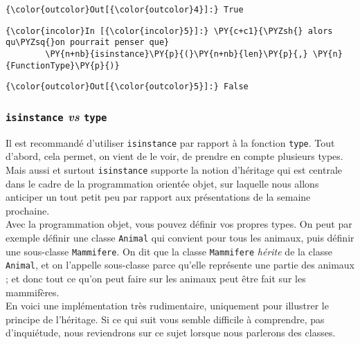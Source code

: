 \begin{Verbatim}[commandchars=\\\{\}]
{\color{outcolor}Out[{\color{outcolor}4}]:} True
\end{Verbatim}
            
    \begin{Verbatim}[commandchars=\\\{\}]
{\color{incolor}In [{\color{incolor}5}]:} \PY{c+c1}{\PYZsh{} alors qu\PYZsq{}on pourrait penser que}
        \PY{n+nb}{isinstance}\PY{p}{(}\PY{n+nb}{len}\PY{p}{,} \PY{n}{FunctionType}\PY{p}{)}
\end{Verbatim}


\begin{Verbatim}[commandchars=\\\{\}]
{\color{outcolor}Out[{\color{outcolor}5}]:} False
\end{Verbatim}
            
    \hypertarget{isinstance-vs-type}{%
\subsubsection{\texorpdfstring{\texttt{isinstance} \emph{vs}
\texttt{type}}{isinstance vs type}}\label{isinstance-vs-type}}

    Il est recommandé d'utiliser \texttt{isinstance} par rapport à la
fonction \texttt{type}. Tout d'abord, cela permet, on vient de le voir,
de prendre en compte plusieurs types.\\

Mais aussi et surtout \texttt{isinstance} supporte la notion d'héritage
qui est centrale dans le cadre de la programmation orientée objet, sur
laquelle nous allons anticiper un tout petit peu par rapport aux
présentations de la semaine prochaine.\\

Avec la programmation objet, vous pouvez définir vos propres types. On
peut par exemple définir une classe \texttt{Animal} qui convient pour
tous les animaux, puis définir une sous-classe \texttt{Mammifere}. On
dit que la classe \texttt{Mammifere} \emph{hérite} de la classe
\texttt{Animal}, et on l'appelle sous-classe parce qu'elle représente
une partie des animaux ; et donc tout ce qu'on peut faire sur les
animaux peut être fait sur les mammifères.\\

En voici une implémentation très rudimentaire, uniquement pour illustrer
le principe de l'héritage. Si ce qui suit vous semble difficile à
comprendre, pas d'inquiétude, nous reviendrons sur ce sujet lorsque nous
parlerons des classes.

